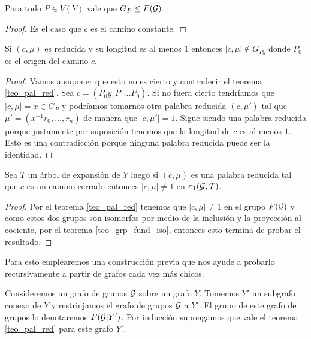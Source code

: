 \documentclass[tesis.tex]{subfiles}
\newcommand{\cG}{ {\cal G} }
\begin{document}
\begin{coro}\label{coro_pal_red_1}
	Para todo $P \in V(Y)$ vale que $G_P \le F(\cG)$.
\end{coro}
\begin{proof}
	Es el caso que $c$ es el camino constante.
\end{proof}

\begin{coro}\label{coro_pal_red_2}
	Si $(c, \mu)$ es reducida y su longitud es al menos $1$ entonces $|c, \mu| \notin G_{P_0}$ donde $P_0$ es el origen del camino $c$.
\end{coro}
\begin{proof}
	Vamos a suponer que esto no es cierto y contradecir el teorema \ref{teo_pal_red}.
	Sea $c = (P_0y_1P_1\dots P_0)$.
	Si no fuera cierto tendríamos que $|c,\mu| = x \in G_P$ y podríamos tomarnos otra palabra reducida $(c,\mu')$ tal que $\mu' = (x^{-1}r_0, \dots, r_n)$ de manera que $|c,\mu'| = 1$.
	Sigue siendo una palabra reducida porque justamente por suposición tenemos que la longitud de $c$ es al menos $1$.
	Esto es una contradicción porque ninguna palabra reducida puede ser la identidad.
\end{proof}

\begin{coro}\label{coro_pal_red_3}
	Sea $T$ un árbol de expansión de $Y$ luego si $(c, \mu)$ es una palabra reducida tal que $c$ es un camino cerrado entonces $|c,\mu| \neq 1$ en $\pi_1(\cG, T)$. 
\end{coro}
\begin{proof}
	Por el teorema \ref{teo_pal_red} tenemos que $|c,\mu| \neq 1$ en el grupo $F(\cG)$ y como estos dos grupos son isomorfos por medio de la inclusión y la proyección al cociente, por el teorema \ref{teo_grp_fund_iso}, entonces esto termina de probar el resultado.
\end{proof}

Para esto emplearemos una construcción previa que nos ayude a probarlo recursivamente a partir de grafos cada vez más chicos.

Consideremos un grafo de grupos $\cG$ sobre un grafo $Y$. 
Tomemos $Y'$ un subgrafo conexo de $Y$ y restrinjamos el grafo de grupos $\cG$ a $Y'$. 
El grupo de este grafo de grupos lo denotaremos $F(\cG | Y')$.
Por inducción supongamos que vale el teorema \ref{teo_pal_red} para este grafo $Y'$.
\end{document}
